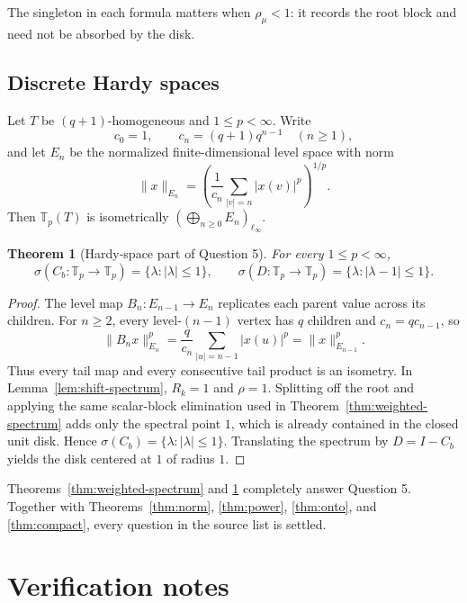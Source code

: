 \documentclass[11pt]{article}
\newtheorem{theorem}{Theorem}
\newcommand{\Cb}{C_b}
\newcommand{\spec}{\sigma}
\begin{document}
The singleton in each formula matters when $\rho_\mu<1$: it records the root
block and need not be absorbed by the disk.

\subsection{Discrete Hardy spaces}

Let $T$ be $(q+1)$-homogeneous and $1\le p<\infty$. Write
\[
  c_0=1,\qquad c_n=(q+1)q^{n-1}\quad(n\ge1),
\]
and let $E_n$ be the normalized finite-dimensional level space with norm
\[
  \|x\|_{E_n}=\left(\frac1{c_n}\sum_{|v|=n}|x(v)|^p\right)^{1/p}.
\]
Then $\mathbb T_p(T)$ is isometrically
$(\bigoplus_{n\ge0}E_n)_{\ell_\infty}$.

\begin{theorem}[Hardy-space part of Question 5]\label{thm:hardy-spectrum}
For every $1\le p<\infty$,
\[
\boxed{\quad
  \spec(\Cb:\mathbb T_p\to\mathbb T_p)=\{\lambda:|\lambda|\le1\},
  \qquad
  \spec(D:\mathbb T_p\to\mathbb T_p)=\{\lambda:|\lambda-1|\le1\}.
\quad}
\]
\end{theorem}

\begin{proof}
The level map $B_n:E_{n-1}\to E_n$ replicates each parent value across its
children. For $n\ge2$, every level-$(n-1)$ vertex has $q$ children and
$c_n=qc_{n-1}$, so
\[
  \|B_nx\|_{E_n}^p
  =\frac q{c_n}\sum_{|u|=n-1}|x(u)|^p
  =\|x\|_{E_{n-1}}^p.
\]
Thus every tail map and every consecutive tail product is an isometry. In
Lemma~\ref{lem:shift-spectrum}, $R_k=1$ and $\rho=1$. Splitting off the root
and applying the same scalar-block elimination used in
Theorem~\ref{thm:weighted-spectrum} adds only the spectral point $1$, which is
already contained in the closed unit disk. Hence
$\spec(\Cb)=\{\lambda:|\lambda|\le1\}$. Translating the spectrum by
$D=I-\Cb$ yields the disk centered at $1$ of radius $1$.
\end{proof}

Theorems~\ref{thm:weighted-spectrum} and \ref{thm:hardy-spectrum} completely
answer Question 5. Together with Theorems~\ref{thm:norm}, \ref{thm:power},
\ref{thm:onto}, and \ref{thm:compact}, every question in the source list is
settled.

\section{Verification notes}
\end{document}
